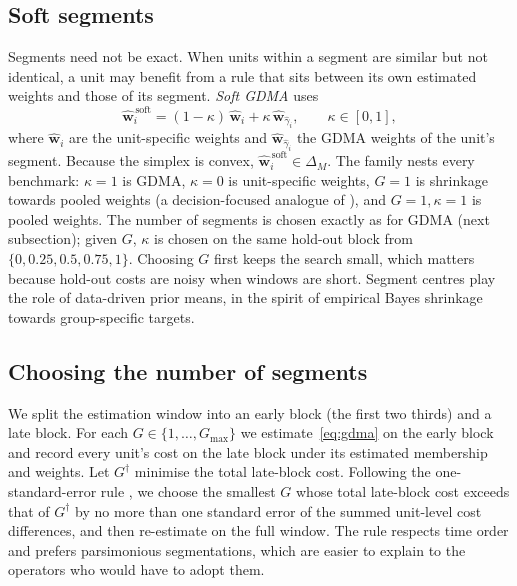 \subsection{Soft segments}\label{sec:soft}

Segments need not be exact.
When units within a segment are similar but not identical, a unit may benefit from a rule that sits between its own estimated weights and those of its segment.
\emph{Soft GDMA} uses
\begin{equation}\label{eq:soft}
\widehat{\bm w}^{\,\mathrm{soft}}_i=(1-\kappa)\,\widehat{\bm w}_i+\kappa\,\widehat{\bm w}_{\widehat\gamma_i},\qquad\kappa\in[0,1],
\end{equation}
where $\widehat{\bm w}_i$ are the unit-specific weights and $\widehat{\bm w}_{\widehat\gamma_i}$ the GDMA weights of the unit's segment.
Because the simplex is convex, $\widehat{\bm w}^{\,\mathrm{soft}}_i\in\Delta_M$.
The family nests every benchmark: $\kappa=1$ is GDMA, $\kappa=0$ is unit-specific weights, $G=1$ is shrinkage towards pooled weights (a decision-focused analogue of \citealp{DieboldShin2019}), and $G=1,\kappa=1$ is pooled weights.
The number of segments is chosen exactly as for GDMA (next subsection); given $G$, $\kappa$ is chosen on the same hold-out block from $\{0,0.25,0.5,0.75,1\}$.
Choosing $G$ first keeps the search small, which matters because hold-out costs are noisy when windows are short.
Segment centres play the role of data-driven prior means, in the spirit of empirical Bayes shrinkage towards group-specific targets.

\subsection{Choosing the number of segments}

We split the estimation window into an early block (the first two thirds) and a late block.
For each $G\in\{1,\dots,G_{\max}\}$ we estimate~\eqref{eq:gdma} on the early block and record every unit's cost on the late block under its estimated membership and weights.
Let $G^\dagger$ minimise the total late-block cost.
Following the one-standard-error rule \citep{HastieTibshiraniFriedman2009}, we choose the smallest $G$ whose total late-block cost exceeds that of $G^\dagger$ by no more than one standard error of the summed unit-level cost differences, and then re-estimate on the full window.
The rule respects time order and prefers parsimonious segmentations, which are easier to explain to the operators who would have to adopt them.

